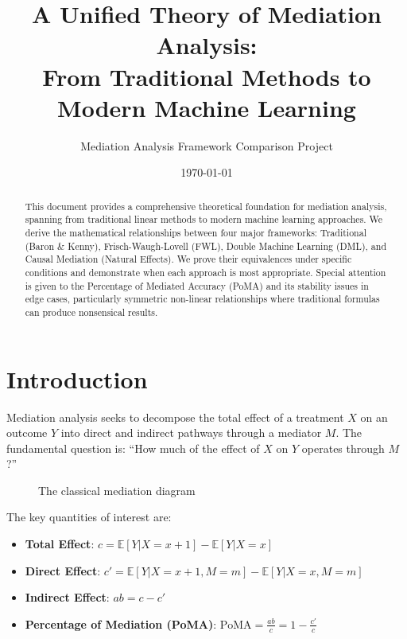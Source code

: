 \documentclass[11pt,a4paper]{article}
\title{A Unified Theory of Mediation Analysis: \\
From Traditional Methods to Modern Machine Learning}
\author{Mediation Analysis Framework Comparison Project}
\date{\today}
\newcommand{\E}{\mathbb{E}}
\begin{document}
\maketitle

\begin{abstract}
This document provides a comprehensive theoretical foundation for mediation analysis, spanning from traditional linear methods to modern machine learning approaches. We derive the mathematical relationships between four major frameworks: Traditional (Baron \& Kenny), Frisch-Waugh-Lovell (FWL), Double Machine Learning (DML), and Causal Mediation (Natural Effects). We prove their equivalences under specific conditions and demonstrate when each approach is most appropriate. Special attention is given to the Percentage of Mediated Accuracy (PoMA) and its stability issues in edge cases, particularly symmetric non-linear relationships where traditional formulas can produce nonsensical results.
\end{abstract}

\tableofcontents
\newpage

\section{Introduction}

Mediation analysis seeks to decompose the total effect of a treatment $X$ on an outcome $Y$ into direct and indirect pathways through a mediator $M$. The fundamental question is: ``How much of the effect of $X$ on $Y$ operates through $M$?''

\begin{figure}[h]
\centering
{}
\caption{The classical mediation diagram}
\end{figure}

The key quantities of interest are:
\begin{itemize}
    \item \textbf{Total Effect}: $c = \E[Y|X=x+1] - \E[Y|X=x]$
    \item \textbf{Direct Effect}: $c' = \E[Y|X=x+1,M=m] - \E[Y|X=x,M=m]$
    \item \textbf{Indirect Effect}: $ab = c - c'$
    \item \textbf{Percentage of Mediation (PoMA)}: $\text{PoMA} = \frac{ab}{c} = 1 - \frac{c'}{c}$
\end{itemize}
\end{document}
